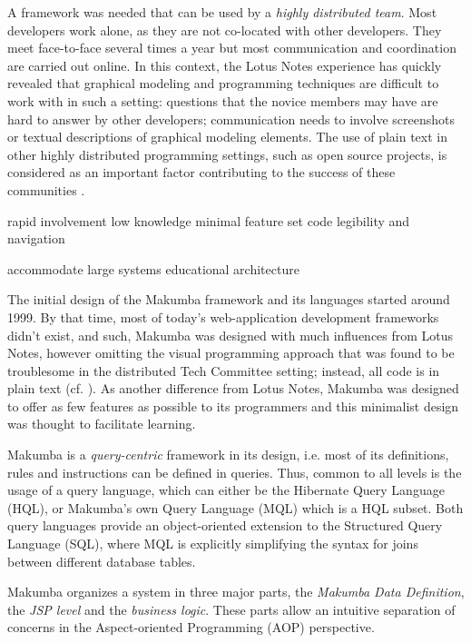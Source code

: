 \documentclass{llncs}
\begin{document}
A framework was needed that can be used by a \textit{highly distributed team}. Most developers work alone, as they are not co-located with other developers. They meet face-to-face several times a year but most communication and coordination are carried out online. In this context, the Lotus Notes experience has quickly revealed that graphical modeling and programming techniques are difficult to work with in such a setting: questions that the novice members may have are hard to answer by other developers; communication needs to involve screenshots or textual descriptions of graphical modeling elements. The use of plain text in other highly distributed programming settings, such as open source projects, is considered as an important factor contributing to the success of these communities \cite{yamauchi00}.

rapid involvement
low knowledge
minimal feature set
code legibility and navigation

accommodate large systems
educational architecture



The initial design of the Makumba framework and its languages started around 1999. By that time, most of today's web-application development frameworks didn't exist, and such, Makumba was designed with much influences from Lotus Notes, however omitting the visual programming approach that was found to be troublesome in the distributed Tech Committee setting; instead, all code is in plain text (cf. ). As another difference from Lotus Notes, Makumba was designed to offer as few features as possible to its programmers and this minimalist design was thought to facilitate learning. 

Makumba is a \textit{query-centric} framework in its design, i.e. most of its definitions, rules and instructions can be defined in queries. Thus, common to all levels is the usage of a query language, which can either be the Hibernate Query Language (HQL), or Makumba's own Query Language (MQL) which is a HQL subset. Both query languages provide an object-oriented extension to the Structured Query Language (SQL), where MQL is explicitly simplifying the syntax for joins between different database tables.

Makumba organizes a system in three major parts, the \textit{Makumba Data Definition}, the \textit{JSP level} and the \textit{business logic}. These parts allow an intuitive separation of concerns in the Aspect-oriented Programming (AOP) \cite{Kiczales97aspect-orientedprogramming} perspective.
\end{document}
